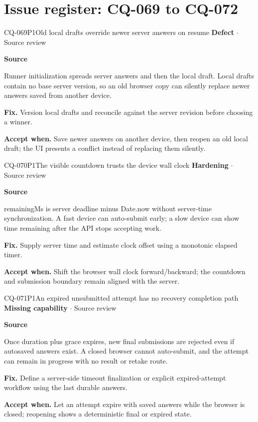 \section*{Issue register: CQ-069 to CQ-072}
\begin{finding}{CQ-069}{P1}{Old local drafts override newer server answers on resume}
\textbf{Defect} $\cdot$ Source review\par
\textbf{Source}\quad{}\par
Runner initialization spreads server answers and then the local draft. Local drafts contain no base server version, so an old browser copy can silently replace newer answers saved from another device.\par
\textbf{Fix.} Version local drafts and reconcile against the server revision before choosing a winner.\par
\textbf{Accept when.} Save newer answers on another device, then reopen an old local draft; the UI presents a conflict instead of replacing them silently.
\end{finding}
\begin{finding}{CQ-070}{P1}{The visible countdown trusts the device wall clock}
\textbf{Hardening} $\cdot$ Source review\par
\textbf{Source}\quad{}\par
remainingMs is server deadline minus Date.now without server-time synchronization. A fast device can auto-submit early; a slow device can show time remaining after the API stops accepting work.\par
\textbf{Fix.} Supply server time and estimate clock offset using a monotonic elapsed timer.\par
\textbf{Accept when.} Shift the browser wall clock forward/backward; the countdown and submission boundary remain aligned with the server.
\end{finding}
\begin{finding}{CQ-071}{P1}{An expired unsubmitted attempt has no recovery completion path}
\textbf{Missing capability} $\cdot$ Source review\par
\textbf{Source}\quad{}\par
Once duration plus grace expires, new final submissions are rejected even if autosaved answers exist. A closed browser cannot auto-submit, and the attempt can remain in progress with no result or retake route.\par
\textbf{Fix.} Define a server-side timeout finalization or explicit expired-attempt workflow using the last durable answers.\par
\textbf{Accept when.} Let an attempt expire with saved answers while the browser is closed; reopening shows a deterministic final or expired state.
\end{finding}
